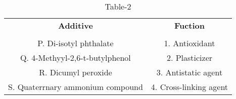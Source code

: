 \begin{table}[htbp]
  \centering
  \caption{Table-2}
  \label{tab:tables/table2.tex}
  \begin{tabular}{cc}
  \textbf{Additive} & \textbf{Fuction} \\ \\
    P. Di-isotyl phthalate & 1. Antioxidant \\
    Q. 4-Methyyl-2,6-t-butylphenol & 2. Plasticizer \\
    R. Dicumyl peroxide & 3. Antistatic agent \\
    S. Quaterrnary ammonium compound & 4. Cross-linking agent \\
  \end{tabular}
\end{table}